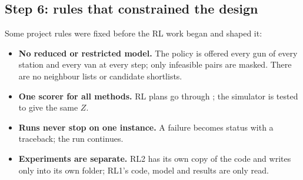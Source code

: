 \subsection{Step 6: rules that constrained the design}

Some project rules were fixed before the RL work began and shaped it:
\begin{itemize}
  \item \textbf{No reduced or restricted model.} The policy is offered every gun of every station and every van at every step; only infeasible pairs are masked. There are no neighbour lists or candidate shortlists.
  \item \textbf{One scorer for all methods.} RL plans go through ; the simulator is tested to give the same $Z$.
  \item \textbf{Runs never stop on one instance.} A failure becomes status  with a traceback; the run continues.
  \item \textbf{Experiments are separate.} RL2 has its own copy of the code and writes only into its own folder; RL1's code, model and results are only read.
\end{itemize}
